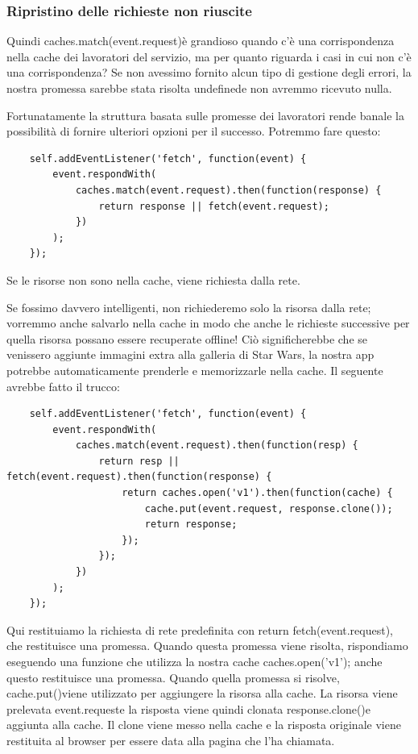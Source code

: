 \documentclass[italian]{article}
\begin{document}
\subsubsection{Ripristino delle richieste non riuscite}
Quindi caches.match(event.request)è grandioso quando c'è una corrispondenza nella cache dei lavoratori del servizio, ma per quanto riguarda i casi in cui non c'è una corrispondenza? Se non avessimo fornito alcun tipo di gestione degli errori, la nostra promessa sarebbe stata risolta undefinede non avremmo ricevuto nulla.

Fortunatamente la struttura basata sulle promesse dei lavoratori rende banale la possibilità di fornire ulteriori opzioni per il successo. Potremmo fare questo:
\begin{lstlisting}
	self.addEventListener('fetch', function(event) {
		event.respondWith(
			caches.match(event.request).then(function(response) {
				return response || fetch(event.request);
			})
		);
	});
\end{lstlisting}
Se le risorse non sono nella cache, viene richiesta dalla rete.

Se fossimo davvero intelligenti, non richiederemo solo la risorsa dalla rete; vorremmo anche salvarlo nella cache in modo che anche le richieste successive per quella risorsa possano essere recuperate offline! Ciò significherebbe che se venissero aggiunte immagini extra alla galleria di Star Wars, la nostra app potrebbe automaticamente prenderle e memorizzarle nella cache. Il seguente avrebbe fatto il trucco:
\begin{lstlisting}
	self.addEventListener('fetch', function(event) {
		event.respondWith(
			caches.match(event.request).then(function(resp) {
				return resp || fetch(event.request).then(function(response) {
					return caches.open('v1').then(function(cache) {
						cache.put(event.request, response.clone());
						return response;
					});  
				});
			})
		);
	});
\end{lstlisting}
Qui restituiamo la richiesta di rete predefinita con return fetch(event.request), che restituisce una promessa. Quando questa promessa viene risolta, rispondiamo eseguendo una funzione che utilizza la nostra cache caches.open('v1'); anche questo restituisce una promessa. Quando quella promessa si risolve, cache.put()viene utilizzato per aggiungere la risorsa alla cache. La risorsa viene prelevata event.requeste la risposta viene quindi clonata response.clone()e aggiunta alla cache. Il clone viene messo nella cache e la risposta originale viene restituita al browser per essere data alla pagina che l'ha chiamata.
\end{document}
